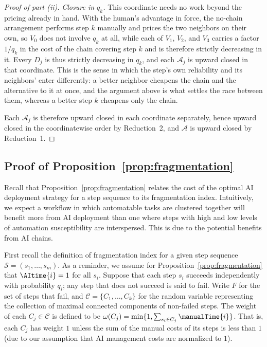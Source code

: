 \begin{proof}[Proof of part (ii)]
\emph{Closure in $q_k$.}
This coordinate needs no work beyond the pricing already in hand.
With the human's advantage in force, the no-chain arrangement performs step $k$ manually and prices the two neighbors on their own, so $V_0$ does not involve $q_k$ at all, while each of $V_1$, $V_2$, and $V_3$ carries a factor $1/q_k$ in the cost of the chain covering step $k$ and is therefore strictly decreasing in it.
Every $D_j$ is thus strictly decreasing in $q_k$, and each $\mathcal{A}_j$ is upward closed in that coordinate.
This is the sense in which the step's own reliability and its neighbors' enter differently: a better neighbor cheapens the chain and the alternative to it at once, and the argument above is what settles the race between them, whereas a better step $k$ cheapens only the chain.

Each $\mathcal{A}_j$ is therefore upward closed in each coordinate separately, hence upward closed in the coordinatewise order by Reduction~2, and $\mathcal{A}$ is upward closed by Reduction~1.
\end{proof}

\subsection{Proof of Proposition~\ref{prop:fragmentation}}
\label{app:fragmentation_proof}

Recall that Proposition~\ref{prop:fragmentation} relates the cost of the optimal AI deployment strategy for a step sequence to its fragmentation index.
Intuitively, we expect a workflow in which automatable tasks are clustered together will benefit more from AI deployment than one where steps with high and low levels of automation susceptibility are interspersed.
This is due to the potential benefits from AI chains.

First recall the definition of fragmentation index for a given step sequence $\mathcal{S} = (s_1, \dotsc, s_m)$.
As a reminder, we assume for Proposition~\ref{prop:fragmentation} that $\AItime{i} = 1$ for all $s_i$.
Suppose that each step $s_i$ succeeds independently with probability $q_i$; any step that does not succeed is said to fail.
Write $F$ for the set of steps that fail, and $\mathcal{C} = \{C_1, \dotsc, C_k\}$ for the random variable representing the collection of maximal connected components of non-failed steps.
The weight of each $C_j \in \mathcal{C}$ is defined to be $\omega(C_j) = \min\{ 1, \sum_{s_i \in C_j} \manualTime{i} \}$.
That is, each $C_j$ has weight $1$ unless the sum of the manual costs of its steps is less than $1$ (due to our assumption that AI management costs are normalized to $1$).

